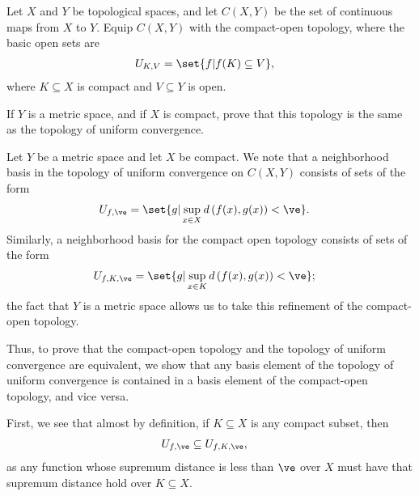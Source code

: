 \documentclass[10pt]{mypackage}
\begin{document}
\begin{problem}[Problem 7]
  Let $X$ and $Y$ be topological spaces, and let $C\left( X,Y \right)$ be the set of continuous maps from $X$ to $Y$. Equip $C\left( X,Y \right)$ with the compact-open topology, where the basic open sets are
  \begin{align*}
    U_{K,V} &= \set{f | f(K)\subseteq V},
  \end{align*}
  where $K\subseteq X$ is compact and $V\subseteq Y$ is open.\newline

  If $Y$ is a metric space, and if $X$ is compact, prove that this topology is the same as the topology of uniform convergence.
\end{problem}
\begin{solution}
  Let $Y$ be a metric space and let $X$ be compact. We note that a neighborhood basis in the topology of uniform convergence on $C\left( X,Y \right)$ consists of sets of the form
  \begin{align*}
    U_{f,\ve} &= \set{g | \sup_{x\in X}d\left( f(x),g(x) \right) < \ve}.
  \end{align*}
  Similarly, a neighborhood basis for the compact open topology consists of sets of the form
  \begin{align*}
    U_{f,K,\ve} &= \set{g | \sup_{x\in K}d\left( f(x),g(x) \right) < \ve};
  \end{align*}
  the fact that $Y$ is a metric space allows us to take this refinement of the compact-open topology.\newline

  Thus, to prove that the compact-open topology and the topology of uniform convergence are equivalent, we show that any basis element of the topology of uniform convergence is contained in a basis element of the compact-open topology, and vice versa.\newline

  First, we see that almost by definition, if $K\subseteq X$ is any compact subset, then
  \begin{align*}
    U_{f,\ve} &\subseteq U_{f,K,\ve},
  \end{align*}
  as any function whose supremum distance is less than $\ve$ over $X$ must have that supremum distance hold over $K\subseteq X$.\newline


\end{solution}
\end{document}
